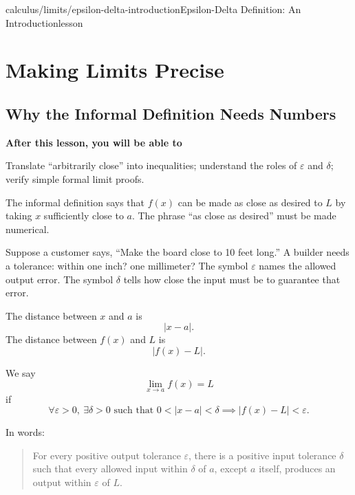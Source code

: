 \documentclass[11pt,openany]{book}
\theoremstyle{bgplain}
\newcommand{\lessonobjective}[1]{%
  \par\Needspace{4\baselineskip}\addvspace{0.6em}%
  {\bfseries\color{BGInk}After this lesson, you will be able to}\par\smallskip
  #1\par\addvspace{0.5em}%
}
\newcommand{\eps}{\varepsilon}
\begin{document}
\begin{webpage}{calculus/limits/epsilon-delta-introduction}{Epsilon-Delta Definition: An Introduction}{lesson}
\chapter{Making Limits Precise}

\section{Why the Informal Definition Needs Numbers}

\lessonobjective{
Translate ``arbitrarily close'' into inequalities; understand the roles of \(\eps\) and \(\delta\); verify simple formal limit proofs.
}

The informal definition says that \(f(x)\) can be made as close as desired to \(L\) by taking \(x\) sufficiently close to \(a\). The phrase ``as close as desired'' must be made numerical.

\begin{bgconcept}
Suppose a customer says, ``Make the board close to 10 feet long.'' A builder needs a tolerance: within one inch? one millimeter? The symbol \(\eps\) names the allowed output error. The symbol \(\delta\) tells how close the input must be to guarantee that error.
\end{bgconcept}

The distance between \(x\) and \(a\) is
\[
  |x-a|.
\]
The distance between \(f(x)\) and \(L\) is
\[
  |f(x)-L|.
\]

\begin{bgdefinition}[title={Formal \(\eps\)-\(\delta\) Definition}]
We say
\[
  \lim_{x\to a}f(x)=L
\]
if
\[
  \boxed{\forall\eps>0,\ \exists\delta>0\text{ such that }
  0<|x-a|<\delta\implies|f(x)-L|<\eps.}
\]
\end{bgdefinition}

In words:

\begin{quote}
For every positive output tolerance \(\eps\), there is a positive input tolerance \(\delta\) such that every allowed input within \(\delta\) of \(a\), except \(a\) itself, produces an output within \(\eps\) of \(L\).
\end{quote}


\end{webpage}
\end{document}
